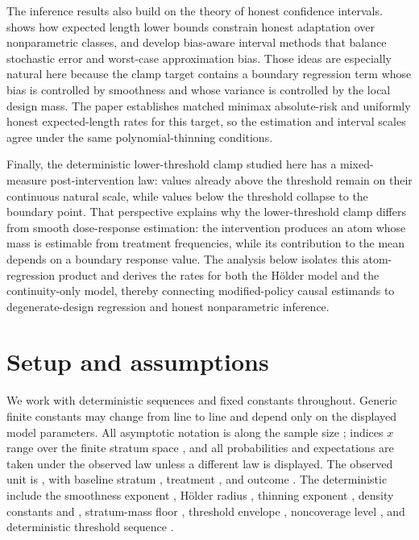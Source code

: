 \documentclass[11pt]{article}
\begin{document}
The inference results also build on the theory of honest confidence intervals. \citet{Low1997NonparametricConfidenceIntervals} shows how expected length lower bounds constrain honest adaptation over nonparametric classes, and \citet{ArmstrongKolesar2018OptimalInference,ArmstrongKolesar2020} develop bias-aware interval methods that balance stochastic error and worst-case approximation bias. Those ideas are especially natural here because the clamp target contains a boundary regression term whose bias is controlled by smoothness and whose variance is controlled by the local design mass. The paper establishes matched minimax absolute-risk and uniformly honest expected-length rates for this target, so the estimation and interval scales agree under the same polynomial-thinning conditions.

Finally, the deterministic lower-threshold clamp studied here has a mixed-measure post-intervention law: values already above the threshold remain on their continuous natural scale, while values below the threshold collapse to the boundary point. That perspective explains why the lower-threshold clamp differs from smooth dose-response estimation: the intervention produces an atom whose mass is estimable from treatment frequencies, while its contribution to the mean depends on a boundary response value. The analysis below isolates this atom-regression product and derives the rates for both the Hölder model and the continuity-only model, thereby connecting modified-policy causal estimands to degenerate-design regression and honest nonparametric inference.


\section{Setup and assumptions}
\label{sec:setup-assumptions}

We work with deterministic sequences and fixed constants throughout. Generic finite constants may change from line to line and depend only on the displayed model parameters. All asymptotic notation is along the sample size ; indices \(x\) range over the finite stratum space , and all probabilities and expectations are taken under the observed law  unless a different law is displayed. The observed unit is , with baseline stratum , treatment , and outcome . The deterministic  include the smoothness exponent , Hölder radius , thinning exponent , density constants  and , stratum-mass floor , threshold envelope , noncoverage level , and deterministic threshold sequence .
\end{document}

